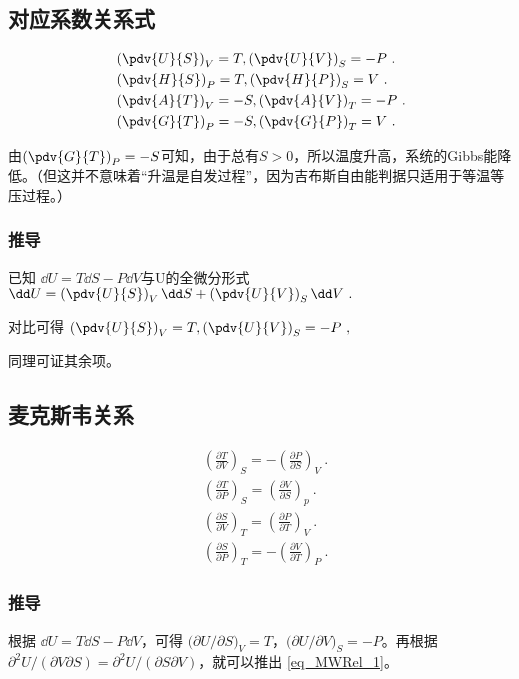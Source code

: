 \subsection{对应系数关系式}
\begin{align}
&\left(\pdv{U}{S}\right)_V=T, \left(\pdv{U}{V}\right)_S=-P~.
\\
&\left(\pdv{H}{S}\right)_P=T, \left(\pdv{H}{P}\right)_S=V~.
\\
&\left(\pdv{A}{T}\right)_V=-S, \left(\pdv{A}{V}\right)_T=-P~.
\\
&\left(\pdv{G}{T}\right)_P=-S, \left(\pdv{G}{P}\right)_T=V~.
\end{align}

由$\left(\pdv{G}{T}\right)_P=-S$可知，由于总有$S>0$，所以温度升高，系统的Gibbs能降低。（但这并不意味着“升温是自发过程”，因为吉布斯自由能判据只适用于等温等压过程。）

\subsubsection{推导}
已知 $\dd U = T \dd S - P \dd V$与U的全微分形式 $\dd U = \left(\pdv{U}{S}\right)_V \dd S+\left(\pdv{U}{V}\right)_S \dd V~.$

对比可得 $\left(\pdv{U}{S}\right)_V=T, \left(\pdv{U}{V}\right)_S=-P~,$

同理可证其余项。

\subsection{麦克斯韦关系}

\begin{align}
&\left(\frac{\partial T}{\partial V}\right)_S=-\left(\frac{\partial P}{\partial S}\right)_V\label{eq_MWRel_1}~.
\\
&\left(\frac{\partial T}{\partial P}\right)_S=\left(\frac{\partial V}{\partial S}\right)_p~.
\\
&\left(\frac{\partial S}{\partial V}\right)_T=\left(\frac{\partial P}{\partial T}\right)_V~.
\\
&\left(\frac{\partial S}{\partial P}\right)_T=-\left(\frac{\partial V}{\partial T}\right)_P~.
\end{align}

\subsubsection{推导}
根据 $\dd U=T\dd S-P\dd V$，可得 $\Big(\partial U/\partial S\Big)_V=T$，$\Big(\partial U/\partial V\Big)_S=-P$。再根据 $\partial^2 U/(\partial V\partial S)=\partial^2 U/(\partial S\partial V)$，就可以推出 \autoref{eq_MWRel_1}。

